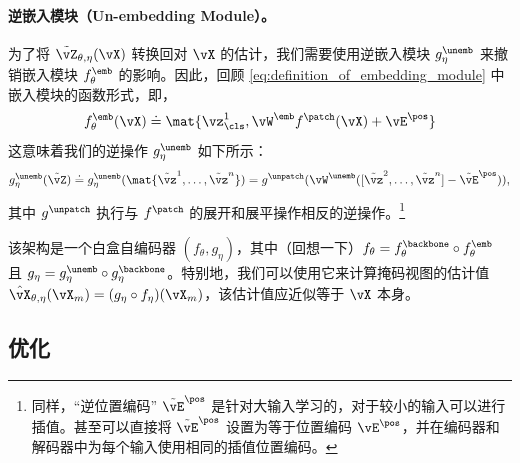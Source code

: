\documentclass[../../book-main_zh.tex]{subfiles}
\begin{document}
\paragraph{逆嵌入模块（Un-embedding Module）。} 为了将 \(\tilde{\vZ}_{\theta, \eta}(\vX)\) 转换回对 \(\vX\) 的估计，我们需要使用逆嵌入模块 \(g_{\eta}^{\unemb}\) 来撤销嵌入模块 \(f_{\theta}^{\emb}\) 的影响。因此，回顾 \eqref{eq:definition_of_embedding_module} 中嵌入模块的函数形式，即，
\begin{equation}
f_{\theta}^{\emb}(\vX) \doteq \mat{\vz_{\cls}^{1},
\vW^{\emb}f^{\patch}(\vX) + \vE^{\pos}}
\end{equation}
这意味着我们的逆操作 \(g_{\eta}^{\unemb}\) 如下所示：
\begin{equation}
g_{\eta}^{\unemb}(\tilde{\vZ}) \doteq
g_{\eta}^{\unemb}(\mat{\tilde{\vz}^{1}, \dots, \tilde{\vz}^{n}}) =
g^{\unpatch}(\vW^{\unemb}([\tilde{\vz}^{2}, \dots, \tilde{\vz}^{n}] -
\tilde{\vE}^{\pos})),
\end{equation}
其中 \(g^{\unpatch}\) 执行与 \(f^{\patch}\) 的展开和展平操作相反的逆操作。\footnote{同样，“逆位置编码” \(\tilde{\vE}^{\pos}\) 是针对大输入学习的，对于较小的输入可以进行插值。甚至可以直接将 \(\tilde{\vE}^{\pos}\) 设置为等于位置编码 \(\vE^{\pos}\)，并在编码器和解码器中为每个输入使用相同的插值位置编码。}

该架构是一个白盒自编码器 \((f_{\theta},
g_{\eta})\)，其中（回想一下）\(f_{\theta} = f_{\theta}^{\backbone}
\circ f_{\theta}^{\emb}\) 且 \(g_{\eta} = g_{\eta}^{\unemb} \circ
g_{\eta}^{\backbone}\)。特别地，我们可以使用它来计算掩码视图的估计值 \(\hat{\vX}_{\theta, \eta}(\vX_{m}) =
(g_{\eta} \circ f_{\eta})(\vX_{m})\)，该估计值应近似等于 \(\vX\) 本身。

\subsection{优化}\label{sub:image_completion_optimization}
\end{document}
